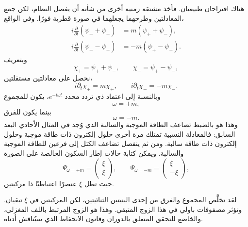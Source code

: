 هناك اقتراحان طبيعيان. فأخذ مشتقة زمنية أخرى من شأنه أن يفصل النظام، لكن جمع المعادلتين وطرحهما يجعلهما في صورة قطرية فورًا. وفي الواقع،
\begin{align}
i\frac{\partial}{\partial t}(\psi_++\psi_-)
&=m(\psi_++\psi_-),\\
i\frac{\partial}{\partial t}(\psi_+-\psi_-)
&=-m(\psi_+-\psi_-).
\end{align}
وبتعريف
\begin{equation}
\chi_+=\psi_++\psi_-,
\qquad
\chi_-=\psi_+-\psi_-,
\end{equation}
نحصل على معادلتين مستقلتين،
\begin{equation}
i\partial_t\chi_+=m\chi_+,
\qquad
i\partial_t\chi_-=-m\chi_-.
\end{equation}
وبالنسبة إلى اعتماد ذي تردد محدد \(e^{-i\omega t}\)، يكون للمجموع
\begin{equation}
\omega=+m,
\end{equation}
بينما يكون للفرق
\begin{equation}
\omega=-m.
\end{equation}
وهذا هو بالضبط تضاعف الطاقة الموجبة والسالبة الذي وُجد في المثال الأحادي البعد السابق: فالمعادلة النسبية تمتلك مرة أخرى حلول إلكترون ذات طاقة موجبة وحلول إلكترون ذات طاقة سالبة. ومن ثم ينفصل تضاعف الكتل إلى فرعين للطاقة الموجبة والسالبة. ويمكن كتابة حالات إطار السكون الخالصة على الصورة
\begin{equation}
\Psi_{\omega=+m}=
\begin{pmatrix}
\xi\\
\xi
\end{pmatrix},
\qquad
\Psi_{\omega=-m}=
\begin{pmatrix}
\xi\\
-\xi
\end{pmatrix},
\end{equation}
حيث تظل \(\xi\) عنصرًا اعتباطيًا ذا مركبتين.

لقد تخلَّص المجموع والفرق من إحدى البنيتين الثنائيتين، لكن المركبتين في \(\xi\) تبقيان. وتؤثر مصفوفات باولي في هذا الزوج المتبقي. وهذا هو الزوج المرتبط باللف المغزلي، والخاضع للتحقق المتعلق بالدوران وقانون الانحفاظ الذي سيُناقش أدناه.

\begin{classroomqa}
\end{classroomqa}

